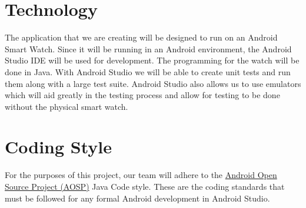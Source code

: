 ﻿\documentclass{article}
\begin{document}
\section{Technology}

The application that we are creating will be designed to run on an Android Smart Watch. Since it will be running in an Android environment, the Android Studio IDE will be used for development. The programming for the watch will be done in Java. With Android Studio we will be able to create unit tests and run them along with a large test suite. Android Studio also allows us to use emulators which will aid greatly in the testing process and allow for testing to be done without the physical smart watch.

\section{Coding Style}

For the purposes of this project, our team will adhere to the \href{https://source.android.com/setup/code-style}{Android Open Source Project (AOSP)} Java Code style. These are the coding standards that must be followed for any formal Android development in Android Studio. 
\end{document}
